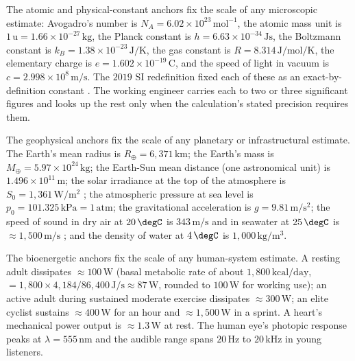 The atomic and physical-constant anchors fix the scale of any
microscopic estimate: Avogadro's number is $N_{A} = 6.02 \times
10^{23} \,\text{mol}^{-1}$, the atomic mass unit is $1 \,\text{u}
= 1.66 \times 10^{-27} \,\si{\kilogram}$, the Planck constant is
$h = 6.63 \times 10^{-34} \,\si{\joule\second}$, the Boltzmann
constant is $k_{B} = 1.38 \times 10^{-23} \,\si{\joule\per\kelvin}$,
the gas constant is $R = 8.314 \,\si{\joule\per\mole\per\kelvin}$,
the elementary charge is $e = 1.602 \times 10^{-19} \,
\si{\coulomb}$, and the speed of light in vacuum is $c = 2.998
\times 10^{8} \,\si{\meter\per\second}$. The $2019$ SI redefinition
fixed each of these as an exact-by-definition constant
\cite{web:ch09t3b-codata-2018}. The working engineer carries each
to two or three significant figures and looks up the rest only
when the calculation's stated precision requires them.

The geophysical anchors fix the scale of any planetary or
infrastructural estimate. The Earth's mean radius is
$R_{\oplus} = 6{,}371 \,\si{\kilo\meter}$; the Earth's mass is
$M_{\oplus} = 5.97 \times 10^{24} \,\si{\kilogram}$; the
Earth-Sun mean distance (one astronomical unit) is
$1.496 \times 10^{11} \,\si{\meter}$; the solar irradiance at the
top of the atmosphere is $S_{0} = 1{,}361 \,\si{\watt\per\meter\squared}$
\cite{data:ch09t3b-iso-21348-2007}; the atmospheric pressure at sea
level is $p_{0} = 101.325 \,\si{\kilo\pascal} = 1 \,\text{atm}$;
the gravitational acceleration is $g = 9.81 \,
\si{\meter\per\second\squared}$; the speed of sound in dry air at
$20\,\degC$ is $343 \,\si{\meter\per\second}$ and in seawater at
$25\,\degC$ is $\approx 1{,}500 \,\si{\meter\per\second}$
\cite{web:ch09t3b-nist-rp-2024}; and the density of water at
$4\,\degC$ is $1{,}000 \,\si{\kilogram\per\meter\cubed}$.

The bioenergetic anchors fix the scale of any human-system
estimate. A resting adult dissipates $\approx 100 \,\si{\watt}$
(basal metabolic rate of about $1{,}800 \,\text{kcal/day}$,
$= 1{,}800 \times 4{,}184 / 86{,}400 \,\si{\joule\per\second}
\approx 87 \,\si{\watt}$, rounded to $100 \,\si{\watt}$ for
working use); an active adult during
sustained moderate exercise dissipates $\approx 300 \,\si{\watt}$;
an elite cyclist sustains $\approx 400 \,\si{\watt}$ for an hour
and $\approx 1{,}500 \,\si{\watt}$ in a sprint. A heart's
mechanical power output is $\approx 1.3 \,\si{\watt}$ at rest. The
human eye's photopic response peaks at $\lambda = 555 \,
\si{\nano\meter}$ and the audible range spans $20 \,\si{\hertz}$
to $20 \,\si{\kilo\hertz}$ in young listeners.

